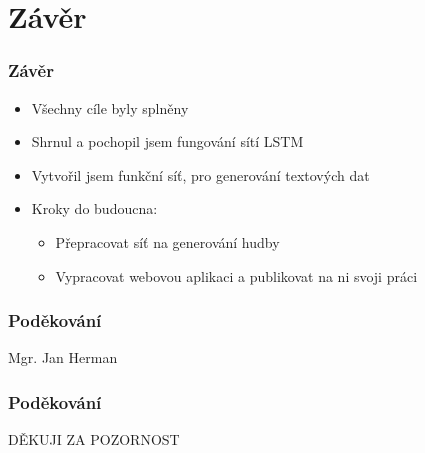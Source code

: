 \documentclass{beamer}
\begin{document}
	\section{Závěr}
	\begin{frame}
	\frametitle{Závěr}
		\begin{itemize}
			\item Všechny cíle byly splněny
			\item Shrnul a pochopil jsem fungování sítí LSTM
			\item Vytvořil jsem funkční síť, pro generování textových dat
			\item Kroky do budoucna:
			\begin{itemize}
				\item Přepracovat síť na generování hudby
				\item Vypracovat webovou aplikaci a publikovat na ni svoji práci
			\end{itemize}
		\end{itemize}
	\end{frame}
	
	


	\begin{frame}
	\frametitle{Poděkování}
		\begin{center}
			{\LARGE Mgr. Jan Herman}
		\end{center}
	\end{frame}

	\begin{frame}
		\frametitle{Poděkování}
		\begin{center}
			{\LARGE DĚKUJI ZA POZORNOST}
		\end{center}
	\end{frame}
\end{document}
